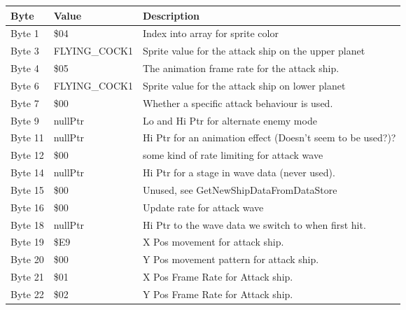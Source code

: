 \begin{figure}[H]
{\begin{adjustbox}{width=12cm}
\begin{tabular}{lll}
\toprule
 Byte    & Value                      & Description                                                        \\
\midrule
 Byte 1  & \$04                        & Index into array for sprite color                                  \\
 Byte 3  & FLYING\_COCK1               & Sprite value for the attack ship on the upper planet               \\
 Byte 4  & \$05                        & The animation frame rate for the attack ship.                      \\
 Byte 6  & FLYING\_COCK1               & Sprite value for the attack ship on lower planet                   \\
 Byte 7  & \$00                        & Whether a specific attack behaviour is used.                       \\
 Byte 9  & nullPtr                    & Lo and Hi Ptr for alternate enemy mode                             \\
 Byte 11 & nullPtr                    & Hi Ptr for an animation effect (Doesn't seem to be used?)?         \\
 Byte 12 & \$00                        & some kind of rate limiting for attack wave                         \\
 Byte 14 & nullPtr                    & Hi Ptr for a stage in wave data (never used).                      \\
 Byte 15 & \$00                        & Unused, see GetNewShipDataFromDataStore                            \\
 Byte 16 & \$00                        & Update rate for attack wave                                        \\
 Byte 18 & nullPtr                    & Hi Ptr to the wave data we switch to when first hit.               \\
 Byte 19 & \$E9                        & X Pos movement for attack ship.                                    \\
 Byte 20 & \$00                        & Y Pos movement pattern for attack ship.                            \\
 Byte 21 & \$01                        & X Pos Frame Rate for Attack ship.                                  \\
 Byte 22 & \$02                        & Y Pos Frame Rate for Attack ship.                                  \\

\end{tabular}
\end{adjustbox}}
\end{figure}
